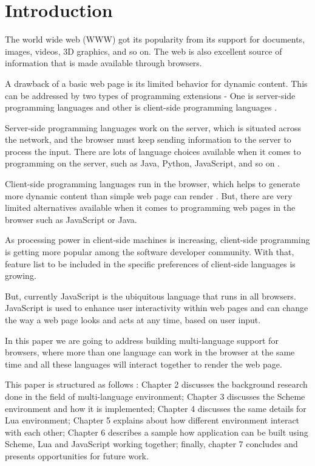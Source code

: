 \chapter{Introduction}
The world wide web (WWW) got its popularity from its support for documents, images, videos, 3D graphics, and so on. The web is also excellent source of information that is made available through browsers.

A drawback of a basic web page is its limited behavior for dynamic content. This can be addressed by two types of programming extensions -  One is server-side programming languages and other is client-side programming languages \cite{LoginWeb}.

Server-side programming languages work on the server, which is situated across the network, and the browser must keep sending information to the server to process the input. There are lots of language choices available when it comes to programming on the server, such as Java, Python, JavaScript, and so on \cite{LoginWeb}. 

Client-side programming languages run in the browser, which helps to generate more dynamic content than simple web page can render \cite{Hickey:2004:SWP:1028174.971423}. But, there are very limited alternatives available when it comes to programming web pages in the browser such as JavaScript or Java.

As processing power in client-side machines is increasing, client-side programming is getting more popular among the software developer community. With that, feature list to be included in the specific preferences of client-side languages is growing. 

But, currently JavaScript is the ubiquitous language that runs in all browsers. JavaScript is used to enhance user interactivity within web pages and can change the way a web page looks and acts at any time, based on user input.

In this paper we are going to address building multi-language support for browsers, where more than one language can work in the browser at the same time and all these languages will interact together to render the web page. 


This paper is structured as follows :
Chapter 2 discusses the background research done in the field of multi-language environment; Chapter 3 discusses the Scheme environment and how it is implemented; Chapter 4 discusses the same details for Lua environment; Chapter 5 explains about how different environment interact with each other; Chapter 6 describes a sample how application can be built using Scheme, Lua and JavaScript working together; finally, chapter 7 concludes and presents opportunities for future work.

